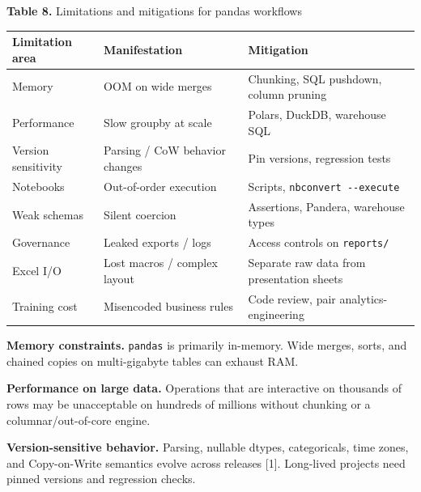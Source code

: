 \documentclass[
  12pt,
]{article}
\newcounter{none} %
\begin{document}
\textbf{Table 8.} Limitations and mitigations for pandas workflows

{\def\LTcaptype{none} %
\begin{longtable}[]{@{}
  >{\raggedright\arraybackslash}p{}
  >{\raggedright\arraybackslash}p{}
  >{\raggedright\arraybackslash}p{}@{}}
\toprule\noalign{}
\begin{minipage}[b]{\linewidth}\raggedright
Limitation area
\end{minipage} & \begin{minipage}[b]{\linewidth}\raggedright
Manifestation
\end{minipage} & \begin{minipage}[b]{\linewidth}\raggedright
Mitigation
\end{minipage} \\
\midrule\noalign{}
\endhead
\bottomrule\noalign{}
\endlastfoot
Memory & OOM on wide merges & Chunking, SQL pushdown, column pruning \\
Performance & Slow groupby at scale & Polars, DuckDB, warehouse SQL \\
Version sensitivity & Parsing / CoW behavior changes & Pin versions,
regression tests \\
Notebooks & Out-of-order execution & Scripts,
\texttt{nbconvert\ -\/-execute} \\
Weak schemas & Silent coercion & Assertions, Pandera, warehouse types \\
Governance & Leaked exports / logs & Access controls on
\texttt{reports/} \\
Excel I/O & Lost macros / complex layout & Separate raw data from
presentation sheets \\
Training cost & Misencoded business rules & Code review, pair
analytics-engineering \\
\end{longtable}
}

\textbf{Memory constraints.} \texttt{pandas} is primarily in-memory.
Wide merges, sorts, and chained copies on multi-gigabyte tables can
exhaust RAM.

\textbf{Performance on large data.} Operations that are interactive on
thousands of rows may be unacceptable on hundreds of millions without
chunking or a columnar/out-of-core engine.

\textbf{Version-sensitive behavior.} Parsing, nullable dtypes,
categoricals, time zones, and Copy-on-Write semantics evolve across
releases {[}1{]}. Long-lived projects need pinned versions and
regression checks.
\end{document}
